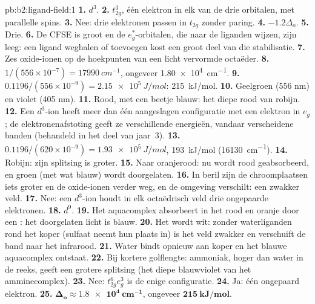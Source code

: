 \begin{solution}{pb:b2:ligand-field:1}
\textbf{1.} $d^3$.
\textbf{2.} $t_{2g}^3$, één elektron in elk van de drie orbitalen, met parallelle spins.
\textbf{3.} Nee: drie elektronen passen in $t_{2g}$ zonder paring.
\textbf{4.} $-1.2\Delta_o$.
\textbf{5.} Drie.
\textbf{6.} De CFSE is groot en de $e_g^*$-orbitalen, die naar de liganden wijzen, zijn
leeg: een ligand weghalen of toevoegen kost een groot deel van die stabilisatie.
\textbf{7.} Zes oxide-ionen op de hoekpunten van een licht vervormde octaëder.
\textbf{8.} $1/(556 \times 10^{-7}) = \qty{17990}{cm^{-1}}$, ongeveer \qty{1.80e4}{cm^{-1}}.
\textbf{9.} $0.1196/(556 \times 10^{-9}) = \qty{2.15e5}{J/mol}$: \qty{215}{kJ/mol}.
\textbf{10.} Geelgroen (556 nm) en violet (405 nm).
\textbf{11.} Rood, met een beetje blauw: het diepe rood van robijn.
\textbf{12.} Een $d^3$-ion heeft meer dan één aangeslagen configuratie met een elektron in $e_g$;
de elektronenafstoting geeft ze verschillende energieën, vandaar verscheidene banden (behandeld in het
deel van jaar~3).
\textbf{13.} $0.1196/(620 \times 10^{-9}) = \qty{1.93e5}{J/mol}$, \qty{193}{kJ/mol}
(\qty{16130}{cm^{-1}}).
\textbf{14.} Robijn: zijn splitsing is groter.
\textbf{15.} Naar oranjerood: nu wordt rood geabsorbeerd, en groen (met wat blauw) wordt doorgelaten.
\textbf{16.} In beril zijn de chroomplaatsen iets groter en de oxide-ionen verder weg,
en de omgeving verschilt: een zwakker veld.
\textbf{17.} Nee: een $d^3$-ion houdt in elk octaëdrisch veld drie ongepaarde elektronen.
\textbf{18.} $d^9$.
\textbf{19.} Het aquacomplex absorbeert in het rood en oranje door een : het
doorgelaten licht is blauw.
\textbf{20.} Het wordt wit: zonder waterliganden rond het koper (sulfaat neemt hun
plaats in) is het veld zwakker en verschuift de band naar het infrarood.
\textbf{21.} Water bindt opnieuw aan koper en het blauwe aquacomplex ontstaat.
\textbf{22.} Bij kortere golflengte: ammoniak, hoger dan water in de reeks, geeft een grotere
splitsing (het diepe blauwviolet van het amminecomplex).
\textbf{23.} Nee: $t_{2g}^6e_g^3$ is de enige configuratie.
\textbf{24.} Ja: één ongepaard elektron.
\textbf{25.} $\boldsymbol{\Delta_o \approx \qty{1.8e4}{cm^{-1}}}$, ongeveer
$\boldsymbol{\qty{215}{kJ/mol}}$.
\end{solution}
